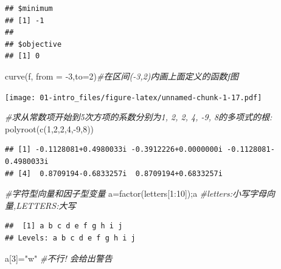 \documentclass[
]{book}
\newenvironment{Shaded}{\begin{snugshade}}{\end{snugshade}}
\newcommand{\AttributeTok}[1]{\textcolor[rgb]{0.77,0.63,0.00}{#1}}
\newcommand{\CommentTok}[1]{\textcolor[rgb]{0.56,0.35,0.01}{\textit{#1}}}
\newcommand{\DecValTok}[1]{\textcolor[rgb]{0.00,0.00,0.81}{#1}}
\newcommand{\FunctionTok}[1]{\textcolor[rgb]{0.00,0.00,0.00}{#1}}
\newcommand{\NormalTok}[1]{#1}
\newcommand{\OtherTok}[1]{\textcolor[rgb]{0.56,0.35,0.01}{#1}}
\newcommand{\SpecialCharTok}[1]{\textcolor[rgb]{0.00,0.00,0.00}{#1}}
\newcommand{\StringTok}[1]{\textcolor[rgb]{0.31,0.60,0.02}{#1}}
\begin{document}
\begin{verbatim}
## $minimum
## [1] -1
## 
## $objective
## [1] 0
\end{verbatim}

\begin{Shaded}
\begin{Highlighting}[]
\FunctionTok{curve}\NormalTok{(f, }\AttributeTok{from =} \SpecialCharTok{{-}}\DecValTok{3}\NormalTok{,}\AttributeTok{to=}\DecValTok{2}\NormalTok{)}\CommentTok{\#在区间({-}3,2)内画上面定义的函数f图}
\end{Highlighting}
\end{Shaded}

\texttt{[image: 01-intro\_files/figure-latex/unnamed-chunk-1-17.pdf]}

\begin{Shaded}
\begin{Highlighting}[]
\CommentTok{\#求从常数项开始到5次方项的系数分别为1, 2, 2, 4, {-}9, 8的多项式的根: }
\FunctionTok{polyroot}\NormalTok{(}\FunctionTok{c}\NormalTok{(}\DecValTok{1}\NormalTok{,}\DecValTok{2}\NormalTok{,}\DecValTok{2}\NormalTok{,}\DecValTok{4}\NormalTok{,}\SpecialCharTok{{-}}\DecValTok{9}\NormalTok{,}\DecValTok{8}\NormalTok{))}
\end{Highlighting}
\end{Shaded}

\begin{verbatim}
## [1] -0.1128081+0.4980033i -0.3912226+0.0000000i -0.1128081-0.4980033i
## [4]  0.8709194-0.6833257i  0.8709194+0.6833257i
\end{verbatim}

\begin{Shaded}
\begin{Highlighting}[]
\CommentTok{\#字符型向量和因子型变量}
\NormalTok{a}\OtherTok{=}\FunctionTok{factor}\NormalTok{(letters[}\DecValTok{1}\SpecialCharTok{:}\DecValTok{10}\NormalTok{]);a }\CommentTok{\#letters:小写字母向量,LETTERS:大写}
\end{Highlighting}
\end{Shaded}

\begin{verbatim}
##  [1] a b c d e f g h i j
## Levels: a b c d e f g h i j
\end{verbatim}

\begin{Shaded}
\begin{Highlighting}[]
\NormalTok{a[}\DecValTok{3}\NormalTok{]}\OtherTok{=}\StringTok{"w"} \CommentTok{\#不行! 会给出警告}
\end{Highlighting}
\end{Shaded}
\end{document}
